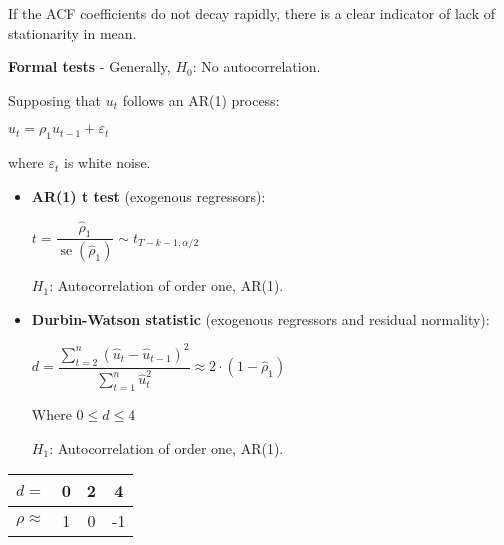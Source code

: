 \documentclass[10pt, a4paper, landscape]{article}
\DeclareMathOperator{\se}{se}
\begin{document}
\begin{multicols}{3}
If the ACF coefficients do not decay rapidly, there is a clear indicator of lack of stationarity in mean.

\textbf{Formal tests} - Generally, \( H_{0} \): No autocorrelation.

Supposing that \( u_{t} \) follows an AR(1) process:

\begin{center}
	\( u_{t} = \rho_{1} u_{t - 1} + \varepsilon_{t} \)
\end{center}

where \( \varepsilon_{t} \) is white noise.

\begin{itemize}[leftmargin=*]
	\item \textbf{AR(1) t test} (exogenous regressors):
	\begin{center}
		\( t = \dfrac{\hat{\rho}_{1}}{\se(\hat{\rho}_{1})} \sim t_{T - k - 1, \alpha / 2} \)
	\end{center}
	\( H_{1} \): Autocorrelation of order one, AR(1).
\end{itemize}

\begin{itemize}[leftmargin=*]
	\item \textbf{Durbin-Watson statistic} (exogenous regressors and residual normality):
	\begin{center}
		\( d = \dfrac{\sum_{t = 2}^{n} (\hat{u}_{t} - \hat{u}_{t - 1})^{2}}{\sum_{t = 1}^{n} \hat{u}_{t}^{2}} \approx 2 \cdot (1 - \hat{\rho}_{1}) \)
	\end{center}
	Where \( 0 \leq d \leq 4 \)

	\( H_{1} \): Autocorrelation of order one, AR(1).
\end{itemize}

\begin{center}
	\begin{tabular}{ c | c | c | c }
		\( d = \)          & 0 & 2 & 4  \\ \hline
		\( \rho \approx \) & 1 & 0 & -1
	\end{tabular}


\end{center}
\end{multicols}
\end{document}
